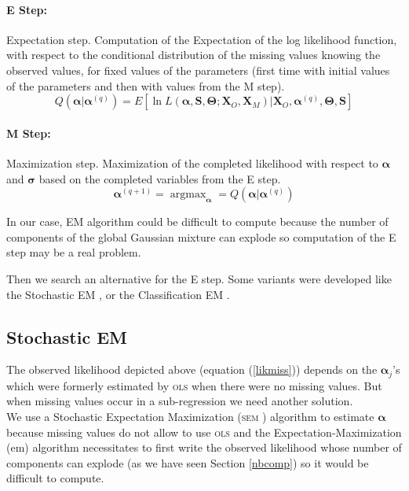 \documentclass[12pt,a4paper]{report}
\begin{document}
\paragraph{E Step:} Expectation step. Computation of the Expectation of the log likelihood function, with respect to the conditional distribution of the missing values knowing the observed values, for fixed values of the parameters (first time with initial values of the parameters and then with values from the M step).
	\begin{equation}
	   Q(\boldsymbol{\alpha}|\boldsymbol{\alpha}^{(q)})= E\left[\ln L(\boldsymbol{\alpha},\boldsymbol{S},\boldsymbol{\Theta};\boldsymbol{X}_O,\boldsymbol{X}_M)|\boldsymbol{X}_O,\boldsymbol{\alpha}^{(q)},\boldsymbol{\Theta},\boldsymbol{S} \right]     \nonumber
	\end{equation}
	
\paragraph{M Step:} Maximization step. Maximization of the completed likelihood with respect to $\boldsymbol{\alpha}$ and $\boldsymbol{\sigma}$ based on the completed variables from the E step.
	\begin{equation}
		\boldsymbol{\alpha}^{(q+1)}=\operatorname{argmax}_{\boldsymbol{\alpha}}=Q(\boldsymbol{\alpha}|\boldsymbol{\alpha}^{(q)})	\nonumber
	\end{equation}
	
	
	In our case, EM algorithm could be difficult to compute because the number of components of the global Gaussian mixture can explode so computation of the E step may be a real problem.
			
			 Then we search an alternative for the E step. Some variants were developed like the Stochastic EM \cite{diebolt1996stochastic},
			 \cite{celeux1986algorithme} or the Classification EM \cite{celeux1992classification}. 
						
\subsection{Stochastic EM}\label{sectionSEMalgo}
	The observed likelihood depicted above (equation (\ref{likmiss})) depends on the $\boldsymbol{\alpha}_j$'s which were formerly estimated by \textsc{ols} when there were no missing values. But when missing values occur in a sub-regression we need another solution.\\
	
	We use a Stochastic Expectation Maximization (\textsc{sem} \cite{celeux1986algorithme}) algorithm  to estimate $\boldsymbol{\alpha}$ because missing values do not allow to use \textsc{ols} and  the Expectation-Maximization ({\sc em}) algorithm necessitates to first write the observed likelihood whose number of components can explode (as we have seen Section \ref{nbcomp}) so it would be difficult to compute.\\
	
\end{document}
